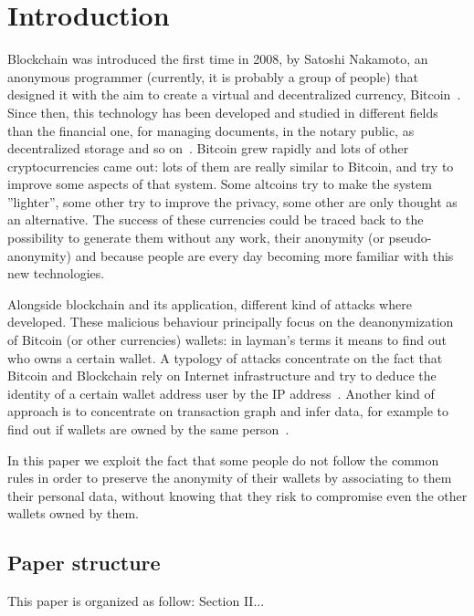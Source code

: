 \section{Introduction}
Blockchain was introduced the first time in 2008, by Satoshi Nakamoto, an
anonymous programmer (currently, it is probably a group of people) that
designed it with the aim to create a virtual and decentralized currency,
Bitcoin~\cite{satoshi}. Since then, this technology has been developed and
studied in different fields than the financial one, for managing documents, in
the notary public, as decentralized storage and so on~\cite{air}. Bitcoin grew
rapidly and lots of other cryptocurrencies came out: lots of them are really
similar to Bitcoin, and try to improve some aspects of that system. Some
altcoins try to make the system ''lighter'', some other try to improve the
privacy, some other are only thought as an alternative. The success of these
currencies could be traced back to the possibility to generate them without any 
work,
their anonymity (or pseudo-anonymity) and because people are every day becoming
more familiar with this new technologies.

Alongside blockchain and its application, different kind of attacks where
developed. These malicious behaviour principally focus on the deanonymization of
Bitcoin (or other currencies) wallets: in layman's terms it means to find out
who owns a certain wallet. A typology of attacks concentrate on the fact that
Bitcoin and Blockchain rely on Internet infrastructure and try to deduce the
identity of a certain wallet address user by the IP address~\cite{deanon}.
Another kind of approach is to concentrate on transaction graph and infer data,
for example to find out if wallets are owned by the same person~\cite{fistful}.

In this paper we exploit the fact that some people do not follow the common
rules in order to preserve the anonymity of their wallets by associating to them
their personal data, without knowing that they risk to compromise even the other
wallets owned by them.


\subsection{Paper structure}
This paper is organized as follow: Section II...